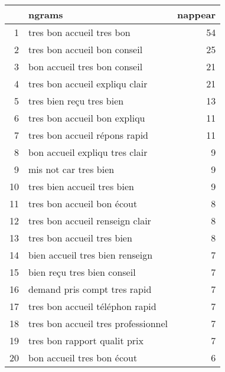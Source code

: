 \begin{tabular}{|r|l|r|}
  \hline
 & ngrams & nappear \\ 
  \hline
1 & tres bon accueil tres bon &  54 \\ 
  2 & tres bon accueil bon conseil &  25 \\ 
  3 & bon accueil tres bon conseil &  21 \\ 
  4 & tres bon accueil expliqu clair &  21 \\ 
  5 & tres bien reçu tres bien &  13 \\ 
  6 & tres bon accueil bon expliqu &  11 \\ 
  7 & tres bon accueil répons rapid &  11 \\ 
  8 & bon accueil expliqu tres clair &   9 \\ 
  9 & mis not car tres bien &   9 \\ 
  10 & tres bien accueil tres bien &   9 \\ 
  11 & tres bon accueil bon écout &   8 \\ 
  12 & tres bon accueil renseign clair &   8 \\ 
  13 & tres bon accueil tres bien &   8 \\ 
  14 & bien accueil tres bien renseign &   7 \\ 
  15 & bien reçu tres bien conseil &   7 \\ 
  16 & demand pris compt tres rapid &   7 \\ 
  17 & tres bon accueil téléphon rapid &   7 \\ 
  18 & tres bon accueil tres professionnel &   7 \\ 
  19 & tres bon rapport qualit prix &   7 \\ 
  20 & bon accueil tres bon écout &   6 \\ 
   \hline
\end{tabular}
